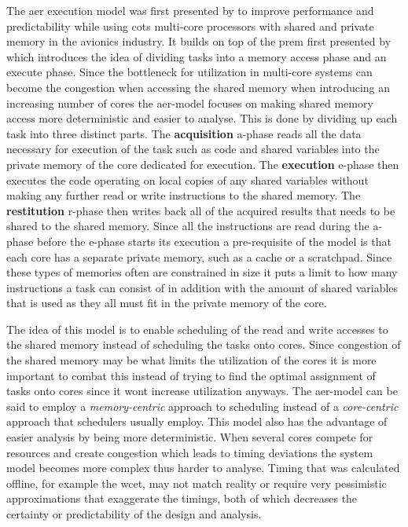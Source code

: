 \documentclass{kththesis}
\begin{document}
The \acrfull{aer} execution model was first presented by \parencite{durrieu_predictable_2014} to
improve performance and predictability while using \acrfull{cots} multi-core processors with shared
and private memory in the avionics industry. It builds on top of the \acrfull{prem} first presented
by \textcite{pellizzoni_predictable_2011} which introduces the idea of dividing tasks into a memory
access phase and an execute phase. Since the bottleneck for utilization in multi-core systems can
become the congestion when accessing the shared memory when introducing an increasing number of
cores the \acrshort{aer}-model focuses on making shared memory access more deterministic and easier
to analyse. This
is done by dividing up each task into three distinct parts. The \textbf{acquisition}
\acrshort{a}-phase reads all
the data necessary for execution of the task such as code and shared variables into the private
memory of the core dedicated for execution. The \textbf{execution} \acrshort{e}-phase then executes the code
operating on local copies of any shared variables without making any further read or write
instructions to the shared memory. The \textbf{restitution} \acrshort{r}-phase then writes back all of the
acquired results that needs to be shared to the shared memory. Since all the instructions are read
during the \acrshort{a}-phase before the \acrshort{e}-phase starts its execution a pre-requisite of
the model
is that each core has a separate private memory, such as a cache or a scratchpad. Since these types
of memories often are constrained in size it puts a limit to how many instructions a task can
consist of in addition with the amount of shared variables that is used as they all must fit in
the private memory of the core.

The idea of this model is to enable scheduling of the read and write accesses to the shared memory
instead of scheduling the tasks onto cores. Since congestion of the shared memory may be what limits
the utilization of the cores it is more important to combat this instead of trying to find the
optimal assignment of tasks onto cores since it wont increase utilization anyways. The
\acrshort{aer}-model
can be said to employ a \textit{memory-centric} approach to scheduling instead of a
\textit{core-centric} approach that schedulers usually employ. This model also has the advantage of
easier analysis by being more deterministic. When several cores compete for resources and create
congestion which leads to timing deviations the system model becomes more complex thus harder to
analyse. Timing that was calculated offline, for example the \acrshort{wcet}, may not match reality
or require very pessimistic approximations that exaggerate the timings, both of which decreases the
certainty or predictability of the design and analysis.
\end{document}
